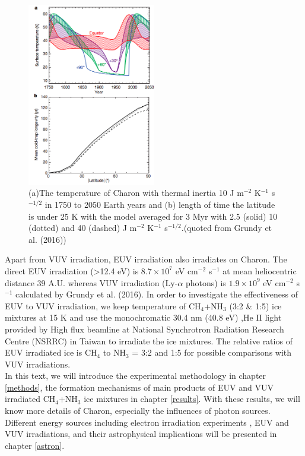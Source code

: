 \begin{figure}
\centering
\includegraphics[width=0.5\textwidth]{figures/chapter1/thermal.png}
\caption{(a)The temperature of Charon with thermal inertia 10 J m$^{-2}$ K$^{-1}$ s$^{-1/2}$ in 1750 to 2050 Earth years and (b) length of time the latitude is under 25 K with the model averaged for 3 Myr with 2.5 (solid) 10 (dotted) and 40 (dashed) J m$^{-2}$ K$^{-1}$ s$^{-1/2}$.(quoted from Grundy et al. (2016)\cite{grundy2016formation})}
\label{fig:Charon_thermal}
\end{figure}

Apart from VUV irradiation, EUV irradiation also irradiates on Charon. The direct EUV irradiation (>12.4 eV) is $8.7 \times 10^7$ eV cm$^{-2}$ s$^{-1}$ at mean heliocentric distance 39 A.U. whereas VUV irradiation (Ly-$\alpha$ photons) is $1.9 \times 10^9$ eV cm$^{-2}$ s$^{-1}$ calculated by Grundy et al. (2016)\cite{grundy2016formation}. In order to investigate the effectiveness of EUV to VUV irradiation, we keep temperature of CH$_4$+NH$_3$ (3:2 \& 1:5) ice mixtures at 15 K and use the monochromatic 30.4 nm (40.8 eV) ,He II light provided by High flux beamline at National Synchrotron Radiation Research Centre (NSRRC) in Taiwan to irradiate the ice mixtures. The relative ratios of EUV irradiated ice is CH$_4$ to NH$_3$ = 3:2 and 1:5 for possible comparisons with VUV irradiations. \\

In this text, we will introduce the experimental methodology in chapter \ref{methods}, the formation mechanisms of main products of  EUV and VUV irradiated CH$_4$+NH$_3$ ice mixtures in chapter \ref{results}. With these results, we will know more details of Charon, especially the influences of photon sources. Different energy sources including electron irradiation experiments , EUV and VUV irradiations, and their astrophysical implications will be presented in chapter \ref{astron}.\\

